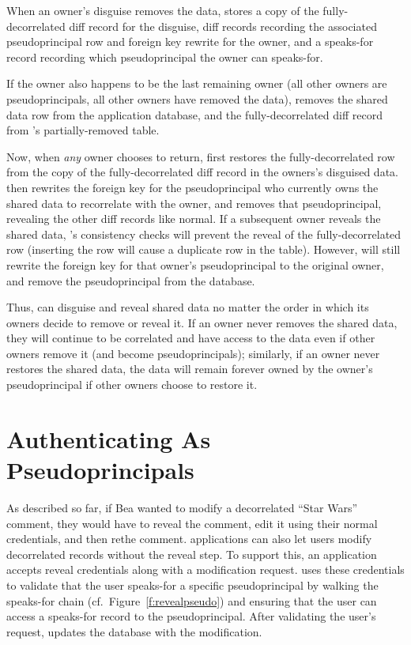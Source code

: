%
When an owner's disguise removes the data, \sys stores a copy of the
fully-decorrelated diff record for the disguise, diff records recording the
associated pseudoprincipal row and foreign key rewrite for the owner, and a
speaks-for record recording which pseudoprincipal the owner can speaks-for.
%

%
If the owner also happens to be the last remaining owner (all other owners are
pseudoprincipals, \ie all other owners have removed the data), \sys removes the
shared data row from the application database, and the fully-decorrelated diff
record from \sys's partially-removed table.
%

%
Now, when \emph{any} owner chooses to return, \sys first restores the
fully-decorrelated row from the copy of the fully-decorrelated diff record in
the owners's disguised data.  \sys then rewrites the foreign key for the
pseudoprincipal who currently owns the shared data to recorrelate with the
owner, and removes that pseudoprincipal, revealing the other diff records like
normal.
%
If a subsequent owner reveals the shared data, \sys's consistency checks will
prevent the reveal of the fully-decorrelated row (inserting the row will cause a
duplicate row in the table). However, \sys will still rewrite the foreign key
for that owner's pseudoprincipal to the original owner, and remove the
pseudoprincipal from the database.
%

%
Thus, \sys can disguise and reveal shared data no matter the order in which its
owners decide to remove or reveal it. If an owner never removes the shared data,
they will continue to be correlated and have access to the data even if other
owners remove it (and become pseudoprincipals); similarly, if an owner never
restores the shared data, the data will remain forever owned by the owner's
pseudoprincipal if other owners choose to restore it.
%





\section{Authenticating As Pseudoprincipals}

As described so far, if Bea wanted to modify a decorrelated ``Star Wars''
comment, they would have to reveal the comment, edit it using their normal
credentials, and then re\xx the comment.
%
\sys applications can also let users modify decorrelated records without the
reveal step.
%
To support this, an application accepts reveal credentials along with a
modification request. \sys uses these credentials to validate that the user
speaks-for a specific pseudoprincipal by walking the speaks-for chain (cf.\
Figure~\ref{f:revealpseudo}) and ensuring that the user can access a speaks-for
record to the pseudoprincipal. After validating the user's request, \sys updates
the database with the modification.
%
%

